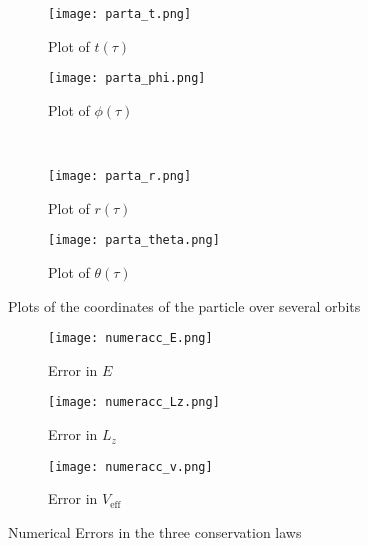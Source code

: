 \documentclass[12pt]{extarticle}
\begin{document}
\begin{figure}[h]
    \centering
    \begin{subfigure}[b]{0.4\textwidth}
        \texttt{[image: parta\_t.png]}
        \caption{Plot of $t(\tau)$}
        \label{figure:4a}
    \end{subfigure}  
    \qquad
    \begin{subfigure}[b]{0.4\textwidth}
        \texttt{[image: parta\_phi.png]}
        \caption{Plot of $\phi(\tau)$}
        \label{figure:4b}
    \end{subfigure} 
    \\ 
    \begin{subfigure}[b]{0.4\textwidth}
        \texttt{[image: parta\_r.png]}
        \caption{Plot of $r(\tau)$}
        \label{figure:4c}
    \end{subfigure} 
    \qquad
    \begin{subfigure}[b]{0.4\textwidth}
        \texttt{[image: parta\_theta.png]}
        \caption{Plot of $\theta(\tau)$}
        \label{figure:4d}
    \end{subfigure}
    \caption{Plots of the coordinates of the particle over several orbits}\label{figure 4}
\end{figure}

\begin{figure}[h]
    \centering
    \begin{subfigure}[b]{0.45\textwidth}
        \texttt{[image: numeracc\_E.png]}
        \caption{Error in $E$}
        \label{figure:5a}
    \end{subfigure}  
    \qquad
    \begin{subfigure}[b]{0.45\textwidth}
        \texttt{[image: numeracc\_Lz.png]}
        \caption{Error in $L_z$}
        \label{figure:5b}
    \end{subfigure} 
    \qquad
    \begin{subfigure}[b]{0.45\textwidth}
        \texttt{[image: numeracc\_v.png]}
        \caption{Error in $V_{\mathrm{eff}}$}
        \label{figure:5c}
    \end{subfigure}
    \caption{Numerical Errors in the three conservation laws} 
    \label{figure 5}
\end{figure}
\end{document}
